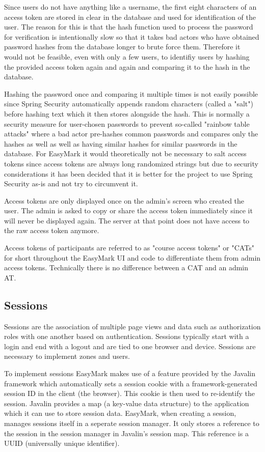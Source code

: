 \documentclass[12pt,a4paper,oneside]{report}
\begin{document}
	Since users do not have anything like a username, the first eight characters of an access token are stored in clear in the database and used for identification of the user. The reason for this is that the hash function used to process the password for verification is intentionally slow so that it takes bad actors who have obtained password hashes from the database  longer to brute force them. Therefore it would not be feasible, even with only a few users, to identifiy users by hashing the provided access token again and again and comparing it to the hash in the database.

	Hashing the password once and comparing it multiple times is not easily possible since Spring Security automatically appends random characters (called a "salt") before hashing text which it then stores alongside the hash. This is normally a security measure for user-chosen passwords to prevent so-called "rainbow table attacks" where a bad actor pre-hashes common passwords and compares only the hashes as well as well as having similar hashes for similar passwords in the database. For EasyMark it would theoretically not be necessary to salt access tokens since access tokens are always long randomized strings but due to security considerations it has been decided that it is better for the project to use Spring Security as-is and not try to circumvent it.

	Access tokens are only displayed once on the admin's screen who created the user. The admin is asked to copy or share the access token immediately since it will never be displayed again. The server at that point does not have access to the raw access token anymore.

	Access tokens of participants are referred to as "course access tokens" or "CATs" for short throughout the EasyMark UI and code to differentiate them from admin access tokens. Technically there is no difference between a CAT and an admin AT.

	\subsection{Sessions}
	Sessions are the association of multiple page views and data such as authorization roles with one another based on authentication. Sessions typically start with a login and end with a logout and are tied to one browser and device. Sessions are necessary to implement zones and users.

	To implement sessions EasyMark makes use of a feature provided by the Javalin framework which automatically sets a session cookie with a framework-generated session ID in the client (the browser). This cookie is then used to re-identify the session. Javalin provides a map (a key-value data structure) to the application which it can use to store session data. EasyMark, when creating a session, manages sessions itself in a seperate session manager. It only stores a reference to the session in the session manager in Javalin's session map. This reference is a UUID (universally unique identifier).
\end{document}
